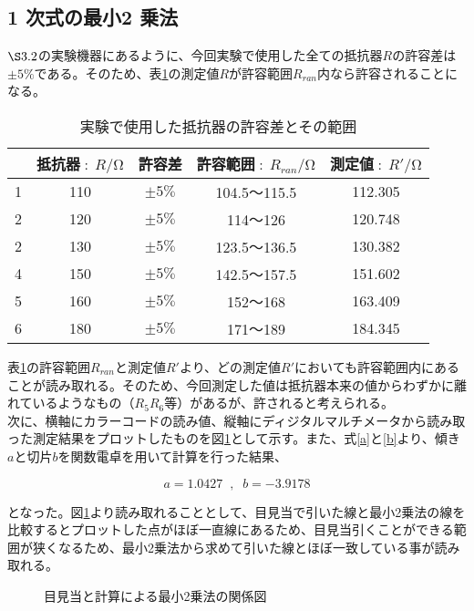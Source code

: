 \documentclass[10pt,a4paper]{jsarticle}
\numberwithin{equation}{section}
\numberwithin{figure}{section}
\numberwithin{table}{section}
\begin{document}
  \subsection{1 次式の最小2 乗法}
  $\S3.2$の実験機器にあるように、今回実験で使用した全ての抵抗器$R$の許容差は$\pm 5\%$である。そのため、表\ref{tab:許容差と測定値}の測定値$R$が許容範囲$R_{ran}$内なら許容されることになる。
  \begin{table}[H]
  \caption{実験で使用した抵抗器の許容差とその範囲}\label{tab:許容差と測定値}
  \begin{center}
      \begin{tabular}{|c|c|c|c|c|}
        \hline
          &抵抗器$\;:\;R / \si{\ohm}$ & 許容差 & 許容範囲$\;:\;R_{ran}/ \si{\ohm}$ & 測定値$\;:\;R\prime/ \si{\ohm}$\\
        \hline
          1&110&$\pm 5\%$&104.5～115.5&112.305\\
          2&120&$\pm 5\%$&114～126&120.748\\
          2&130&$\pm 5\%$&123.5～136.5&130.382\\
          4&150&$\pm 5\%$&142.5～157.5&151.602\\
          5&160&$\pm 5\%$&152～168&163.409\\
          6&180&$\pm 5\%$&171～189&184.345\\
        \hline
      \end{tabular}
  \end{center}
  \end{table}
  表\ref{tab:許容差と測定値}の許容範囲$R_{ran}$と測定値$R\prime$より、どの測定値$R\prime$においても許容範囲内にあることが読み取れる。そのため、今回測定した値は抵抗器本来の値からわずかに離れているようなもの（$R_5R_6$等）があるが、許されると考えられる。\\
  次に、横軸にカラーコードの読み値、縦軸にディジタルマルチメータから読み取った測定結果をプロットしたものを図\ref{fig:1次式グラフ}として示す。また、式\ref{a}と\ref{b}より、傾き$a$と切片$b$を関数電卓を用いて計算を行った結果、

  \begin{equation}
    a=1.0427 \;\; , \;\; b=-3.9178\label{最後}
  \end{equation}

  となった。図\ref{fig:1次式グラフ}より読み取れることとして、目見当で引いた線と最小2乗法の線を比較するとプロットした点がほぼ一直線にあるため、目見当引くことができる範囲が狭くなるため、最小2乗法から求めて引いた線とほぼ一致している事が読み取れる。
  \newpage
  \begin{figure}[H]
    \caption{目見当と計算による最小2乗法の関係図}\label{fig:1次式グラフ}
  \end{figure}
\end{document}
